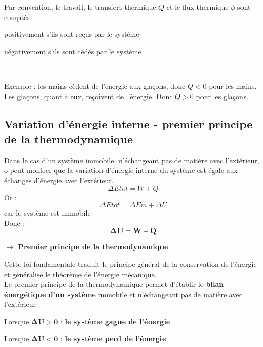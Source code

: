 \documentclass[a4paper,12pt,fleqn]{scrartcl}%
\begin{document}
	Par convention, le travail, le transfert thermique $Q$ et le flux thermique $\phi$ sont comptés :
	\begin{itemize*}
		\item positivement s'ils sont reçus par le système
		\item négativement s'ils sont cédés par le système
	\end{itemize*}
\begin{center}
	\\
\end{center}
	\textcolor{gray!70}{Exemple : les mains cèdent de l'énergie aux glaçons, donc $Q<0$ pour les mains. \\ Les glaçons, quant à eux, reçoivent de l'énergie. Donc $Q>0$ pour les glaçons.}
	\subsection{Variation d'énergie interne - premier principe de la thermodynamique}
	Dans le cas d'un système immobile, n'échangeant pas de matière avec l'extérieur, o peut montrer que  la variation d'énergie interne du système est égale aux échanges d'énergie avec l'extérieur.
	$$\Delta Etot = W + Q $$
	Or : $$\Delta Etot = \Delta Em + \Delta U$$ 
    car le système est immobile\\
    Donc : $$\mathbf{\Delta U = W + Q}$$ 
    \begin{center}
        \textbf{$\rightarrow$ Premier principe de la thermodynamique}
    \end{center}
    
	Cette loi fondamentale traduit le principe général de la conservation de l'énergie et généralise le théorème de l'énergie mécanique.\\
	Le premier principe de la thermodynamique permet d'établir le \textbf{bilan énergétique d'un système} immobile et n'échangeant pas de matière avec l'extérieur :
	\begin{itemize*}
		\item Lorsque $\mathbf{\Delta U > 0}$ : \textbf{le système gagne de l'énergie}
		\item  Lorsque $\mathbf{\Delta U < 0}$ : \textbf{le système perd de l'énergie}
	\end{itemize*}
	
\end{document}
